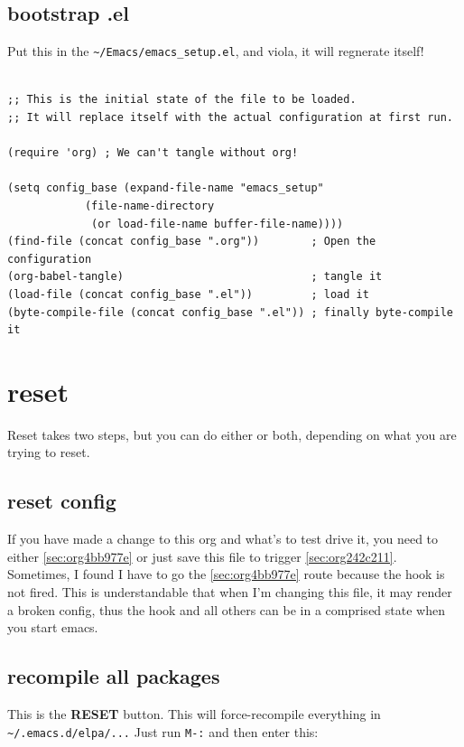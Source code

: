 \documentclass[11pt]{article}
\begin{document}
\subsection{bootstrap .el}
\label{sec:org274852e}

Put this in the \texttt{\textasciitilde{}/Emacs/emacs\_setup.el}, and viola, it will regnerate itself!

\begin{verbatim}

;; This is the initial state of the file to be loaded.
;; It will replace itself with the actual configuration at first run.

(require 'org) ; We can't tangle without org!

(setq config_base (expand-file-name "emacs_setup"
            (file-name-directory
             (or load-file-name buffer-file-name))))
(find-file (concat config_base ".org"))        ; Open the configuration
(org-babel-tangle)                             ; tangle it
(load-file (concat config_base ".el"))         ; load it
(byte-compile-file (concat config_base ".el")) ; finally byte-compile it
\end{verbatim}
\section{reset}
\label{sec:orgf3fd964}

Reset takes two steps, but you can do either or both, depending on
what you are trying to reset.

\subsection{reset config}
\label{sec:orgb8322df}

If you have made a change to this org and what's to test drive it, you
need to either \ref{sec:org4bb977e} or just save this file to trigger \ref{sec:org242c211}. Sometimes, I found I have to go the \ref{sec:org4bb977e} route
because the hook is not fired. This is understandable that when I'm
changing this file, it may render a broken config, thus the hook and
all others can be in a comprised state when you start emacs.

\subsection{recompile all packages}
\label{sec:org7bb9a16}
This is the \textbf{RESET} button. This will force-recompile everything in
\texttt{\textasciitilde{}/.emacs.d/elpa/...} Just run \texttt{M-:} and then enter this:
\end{document}
